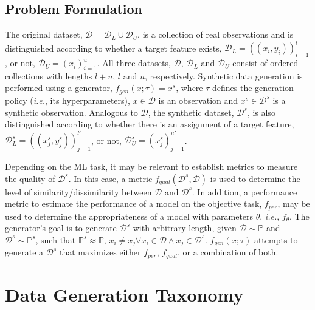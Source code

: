 \documentclass[parskip=full]{scrartcl}
\begin{document}

\subsection{Problem Formulation}\label{sec:problem-formulation}

The original dataset, $\mathcal{D} = \mathcal{D}_L \cup \mathcal{D}_U$,
is a collection of real observations and is distinguished according to whether
a target feature exists, $\mathcal{D}_L = {((x_i, y_i))}^l_{i=1}$, or not,
$\mathcal{D}_U = {(x_i)}^{u}_{i=1}$. All three datasets, $\mathcal{D}$,
$\mathcal{D}_L$ and $\mathcal{D}_U$ consist of ordered collections with
lengths $l+u$, $l$ and $u$, respectively. Synthetic data generation is
performed using a generator, $f_{gen}(x;\tau) = x^s$, where $\tau$
defines the generation policy (\textit{i.e.}, its hyperparameters), $x \in
\mathcal{D}$ is an observation and $x^s \in \mathcal{D}^s$ is a
synthetic observation. Analogous to $\mathcal{D}$, the synthetic dataset,
$\mathcal{D}^s$, is also distinguished according to whether there is an
assignment of a target feature, $\mathcal{D}^s_L = {((x^s_j,
y^s_j))}^{l'}_{j=1}$, or not, $\mathcal{D}^s_U =
{(x^s_j)}^{u'}_{j=1}$.

Depending on the ML task, it may be relevant to establish metrics to measure
the quality of $\mathcal{D}^s$. In this case, a metric
$f_{qual}(\mathcal{D}^s, \mathcal{D})$ is used to determine the level of
similarity/dissimilarity between $\mathcal{D}$ and $\mathcal{D}^s$. In
addition, a performance metric to estimate the performance of a model on the
objective task, $f_{per}$, may be used to determine the appropriateness of a
model with parameters $\theta$, \textit{i.e.}, $f_{\theta}$. The generator's
goal is to generate $\mathcal{D}^s$ with arbitrary length, given
$\mathcal{D} \sim \mathbb{P}$ and $\mathcal{D}^s \sim \mathbb{P}^s$, such
that $\mathbb{P}^s \approx \mathbb{P}$, $x_i \neq x_j \forall x_i \in
\mathcal{D} \wedge x_j \in \mathcal{D}^s$. $f_{gen}(x;\tau)$ attempts to
generate a $\mathcal{D}^s$ that maximizes either $f_{per}$, $f_{qual}$, or a
combination of both.


\section{Data Generation Taxonomy}\label{sec:taxonomy}
\end{document}
